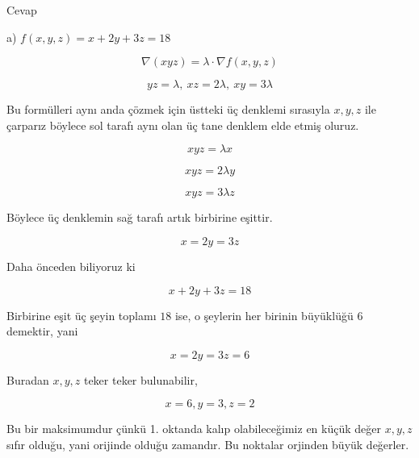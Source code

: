 \documentclass[12pt,fleqn]{article}\usepackage{../../common}
\begin{document}
Cevap

a) $f(x,y,z) = x + 2y + 3z = 18$

$$ \nabla (xyz) = \lambda \cdot \nabla f(x,y,z) $$

$$ yz = \lambda, \ xz = 2\lambda, \ xy = 3\lambda $$

Bu formülleri aynı anda çözmek için üstteki üç denklemi sırasıyla $x,y,z$
ile çarparız böylece sol tarafı aynı olan üç tane denklem elde etmiş
oluruz. 

$$ xyz = \lambda x $$

$$ xyz = 2 \lambda y $$

$$ xyz = 3 \lambda z $$

Böylece üç denklemin sağ tarafı artık birbirine eşittir. 

$$ x = 2y = 3z $$

Daha önceden biliyoruz ki

$$ x + 2y + 3z = 18 $$

Birbirine eşit üç şeyin toplamı $18$ ise, o şeylerin her birinin büyüklüğü
$6$ demektir, yani 

$$ x = 2y = 3z = 6$$

Buradan $x,y,z$ teker teker bulunabilir,

$$ x = 6, y=3, z= 2 $$

Bu bir maksimumdur çünkü 1. oktanda kalıp olabileceğimiz en küçük değer
$x,y,z$ sıfır olduğu, yani orijinde olduğu zamandır. Bu noktalar orjinden
büyük değerler. 
\end{document}
